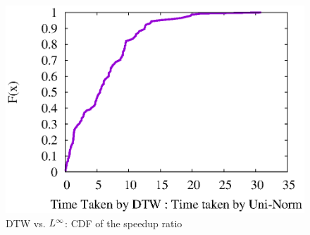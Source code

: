 \begin{figure}
	\centering     
	\includegraphics[scale=0.5]{figs/ratio_dtw_uni_cdf.eps}
	\caption{DTW vs. $L^\infty$: CDF of the speedup ratio}
	\label{fig:time_dtw_ratio}  
\end{figure}

